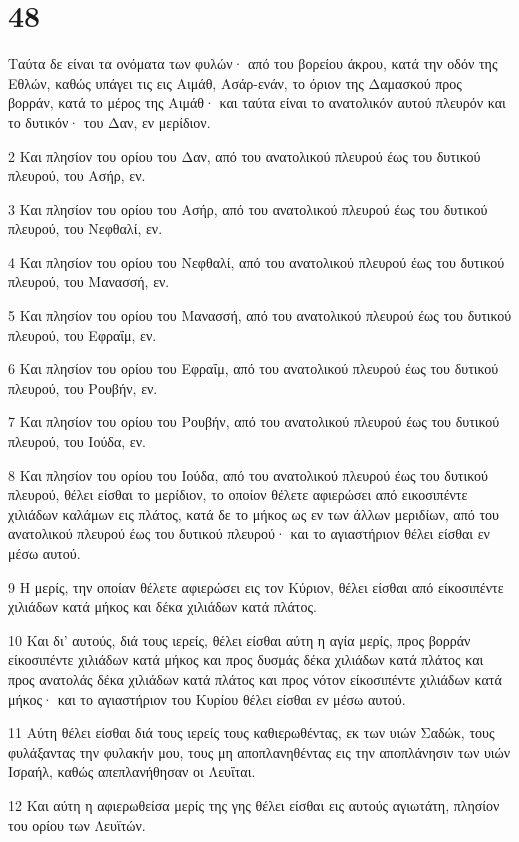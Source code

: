 \chapter{48}

\par Ταύτα δε είναι τα ονόματα των φυλών· από του βορείου άκρου, κατά την οδόν της Εθλών, καθώς υπάγει τις εις Αιμάθ, Ασάρ-ενάν, το όριον της Δαμασκού προς βορράν, κατά το μέρος της Αιμάθ· και ταύτα είναι το ανατολικόν αυτού πλευρόν και το δυτικόν· του Δαν, εν μερίδιον.
\par 2 Και πλησίον του ορίου του Δαν, από του ανατολικού πλευρού έως του δυτικού πλευρού, του Ασήρ, εν.
\par 3 Και πλησίον του ορίου του Ασήρ, από του ανατολικού πλευρού έως του δυτικού πλευρού, του Νεφθαλί, εν.
\par 4 Και πλησίον του ορίου του Νεφθαλί, από του ανατολικού πλευρού έως του δυτικού πλευρού, του Μανασσή, εν.
\par 5 Και πλησίον του ορίου του Μανασσή, από του ανατολικού πλευρού έως του δυτικού πλευρού, του Εφραΐμ, εν.
\par 6 Και πλησίον του ορίου του Εφραΐμ, από του ανατολικού πλευρού έως του δυτικού πλευρού, του Ρουβήν, εν.
\par 7 Και πλησίον του ορίου του Ρουβήν, από του ανατολικού πλευρού έως του δυτικού πλευρού, του Ιούδα, εν.
\par 8 Και πλησίον του ορίου του Ιούδα, από του ανατολικού πλευρού έως του δυτικού πλευρού, θέλει είσθαι το μερίδιον, το οποίον θέλετε αφιερώσει από εικοσιπέντε χιλιάδων καλάμων εις πλάτος, κατά δε το μήκος ως εν των άλλων μεριδίων, από του ανατολικού πλευρού έως του δυτικού πλευρού· και το αγιαστήριον θέλει είσθαι εν μέσω αυτού.
\par 9 Η μερίς, την οποίαν θέλετε αφιερώσει εις τον Κύριον, θέλει είσθαι από είκοσιπέντε χιλιάδων κατά μήκος και δέκα χιλιάδων κατά πλάτος.
\par 10 Και δι' αυτούς, διά τους ιερείς, θέλει είσθαι αύτη η αγία μερίς, προς βορράν είκοσιπέντε χιλιάδων κατά μήκος και προς δυσμάς δέκα χιλιάδων κατά πλάτος και προς ανατολάς δέκα χιλιάδων κατά πλάτος και προς νότον είκοσιπέντε χιλιάδων κατά μήκος· και το αγιαστήριον του Κυρίου θέλει είσθαι εν μέσω αυτού.
\par 11 Αύτη θέλει είσθαι διά τους ιερείς τους καθιερωθέντας, εκ των υιών Σαδώκ, τους φυλάξαντας την φυλακήν μου, τους μη αποπλανηθέντας εις την αποπλάνησιν των υιών Ισραήλ, καθώς απεπλανήθησαν οι Λευΐται.
\par 12 Και αύτη η αφιερωθείσα μερίς της γης θέλει είσθαι εις αυτούς αγιωτάτη, πλησίον του ορίου των Λευϊτών.
